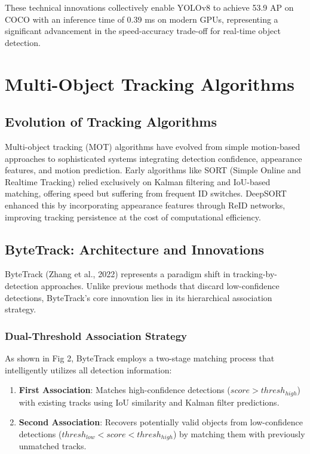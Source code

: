 \documentclass[11pt]{article}
\begin{document}
These technical innovations collectively enable YOLOv8 to achieve 53.9 AP on COCO with an inference time of 0.39 ms on modern GPUs, representing a significant advancement in the speed-accuracy trade-off for real-time object detection.

\section{Multi-Object Tracking Algorithms}

\subsection{Evolution of Tracking Algorithms}
Multi-object tracking (MOT) algorithms have evolved from simple motion-based approaches to sophisticated systems integrating detection confidence, appearance features, and motion prediction. Early algorithms like SORT (Simple Online and Realtime Tracking) relied exclusively on Kalman filtering and IoU-based matching, offering speed but suffering from frequent ID switches. DeepSORT enhanced this by incorporating appearance features through ReID networks, improving tracking persistence at the cost of computational efficiency.

\subsection{ByteTrack: Architecture and Innovations}
ByteTrack (Zhang et al., 2022) represents a paradigm shift in tracking-by-detection approaches. Unlike previous methods that discard low-confidence detections, ByteTrack's core innovation lies in its hierarchical association strategy.

\subsubsection{Dual-Threshold Association Strategy}
As shown in Fig 2, ByteTrack employs a two-stage matching process that intelligently utilizes all detection information:

\begin{enumerate}
    \item \textbf{First Association}: Matches high-confidence detections ($score > thresh_{high}$) with existing tracks using IoU similarity and Kalman filter predictions.
    \item \textbf{Second Association}: Recovers potentially valid objects from low-confidence detections ($thresh_{low} < score < thresh_{high}$) by matching them with previously unmatched tracks.
\end{enumerate}
\end{document}
